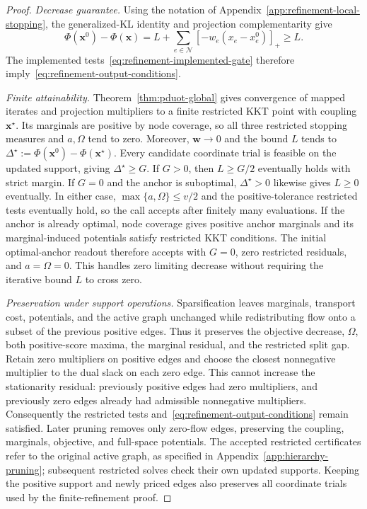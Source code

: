 \begin{proof}
\textit{Decrease guarantee.}
Using the notation of Appendix~\ref{app:refinement-local-stopping}, the generalized-KL identity and projection complementarity give
\begin{equation*}
\Phi(\mathbf x^0)-\Phi(\mathbf x)
=L+\sum_{e\in\mathcal N}[-w_e(x_e-x_e^0)]_+\geq L.
\end{equation*}
The implemented tests~\eqref{eq:refinement-implemented-gate} therefore imply~\eqref{eq:refinement-output-conditions}.

\par\smallskip\noindent\textit{Finite attainability.}
Theorem~\ref{thm:pduot-global} gives convergence of mapped iterates and projection multipliers to a finite restricted KKT point with coupling $\mathbf x^\star$.
Its marginals are positive by node coverage, so all three restricted stopping measures and $a,\Omega$ tend to zero.
Moreover, $\mathbf w\to0$ and the bound $L$ tends to $\Delta^\star:=\Phi(\mathbf x^0)-\Phi(\mathbf x^\star)$.
Every candidate coordinate trial is feasible on the updated support, giving $\Delta^\star\geq G$.
If $G>0$, then $L\geq G/2$ eventually holds with strict margin.
If $G=0$ and the anchor is suboptimal, $\Delta^\star>0$ likewise gives $L\geq0$ eventually.
In either case, $\max\{a,\Omega\}\leq v/2$ and the positive-tolerance restricted tests eventually hold, so the call accepts after finitely many evaluations.
If the anchor is already optimal, node coverage gives positive anchor marginals and its marginal-induced potentials satisfy restricted KKT conditions.
The initial optimal-anchor readout therefore accepts with $G=0$, zero restricted residuals, and $a=\Omega=0$.
This handles zero limiting decrease without requiring the iterative bound $L$ to cross zero.

\par\smallskip\noindent\textit{Preservation under support operations.}
Sparsification leaves marginals, transport cost, potentials, and the active graph unchanged while redistributing flow onto a subset of the previous positive edges.
Thus it preserves the objective decrease, $\Omega$, both positive-score maxima, the marginal residual, and the restricted split gap.
Retain zero multipliers on positive edges and choose the closest nonnegative multiplier to the dual slack on each zero edge.
This cannot increase the stationarity residual: previously positive edges had zero multipliers, and previously zero edges already had admissible nonnegative multipliers.
Consequently the restricted tests and~\eqref{eq:refinement-output-conditions} remain satisfied.
Later pruning removes only zero-flow edges, preserving the coupling, marginals, objective, and full-space potentials.
The accepted restricted certificates refer to the original active graph, as specified in Appendix~\ref{app:hierarchy-pruning}; subsequent restricted solves check their own updated supports.
Keeping the positive support and newly priced edges also preserves all coordinate trials used by the finite-refinement proof.
\end{proof}
